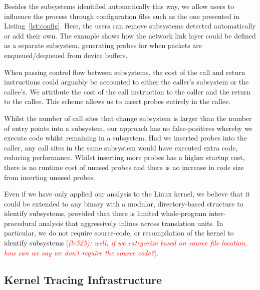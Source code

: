 \documentclass[letterpaper,twocolumn,10pt]{article}
\newcommand{\lnote}[1]{\textcolor{red}{[\textit{#1}]}} %
\begin{document}
Besides the subsystems identified automatically this way, we allow users to
influence the process through configuration files such as the one presented in
Listing~\ref{lst:config}. Here, the users can remove subsystems detected
automatically or add their own. The example shows how the network link layer
could be defined as a separate subsystem, generating probes for when packets are
enqueued/dequeued from device buffers.

When passing control flow between subsystems, the cost of the call and return
instructions could arguably be accounted to either the caller's subsystem or the
callee's. We attribute the cost of the call instruction to the caller and the
return to the callee. This scheme allows us to insert probes entirely in the
callee. 

Whilst the number of call sites that change subsystem is larger than the
number of entry points into a subsystem, our approach has no false-positives
whereby we execute code whilst remaining in a subsystem. Had we inserted probes
into the caller, any call sites in the same subsystem would have executed extra
code, reducing performance. Whilst inserting more probes has a higher startup
cost, there is no runtime cost of unused probes and there is no increase in
code size from inserting unused probes.

Even if we have only applied our analysis to the Linux kernel, we believe that it could
be extended to any binary with a modular, directory-based structure to identify
subsystems, provided that there is limited whole-program inter-procedural
analysis that aggressively inlines across translation units. In particular, we
do not require source-code, or recompilation of the kernel to identify
subsystems \lnote{(lc525): well, if we categorize based on source file location,
how can we say we don't require the source code?}.


\subsection{Kernel Tracing Infrastructure}
\end{document}
